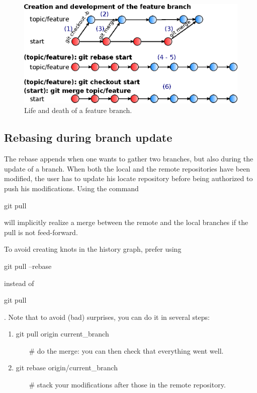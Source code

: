 \begin{figure}[htb]
\centering
\includegraphics[scale=1]{img/life_and_death.eps}
\caption{Life and death of a feature branch.}
\label{fig:life-and-death}
\end{figure}


\subsection{Rebasing during branch update}

The rebase appends when one wants to gather two branches, but also during the update of a branch.
When both the local and the remote repositories have been modified, the user has to update his
locate repository before being authorized to push his modifications.
Using the command \begin{tt}git pull\end{tt} will implicitly realize a merge between the remote and the local branches if the pull is not feed-forward.

To avoid creating knots in the history graph, prefer using \begin{tt}git pull --rebase\end{tt} instead of \begin{tt}git pull\end{tt}. 
Note that to avoid (bad) surprises, you can do it in several steps:\\
\begin{enumerate}[noitemsep]
\item \begin{tt}git pull origin current\_branch\end{tt} ~~~
 \# do the merge: you can then check that everything went well.
\item 
\begin{tt}git rebase  origin/current\_branch\end{tt}  ~~~
 \# stack your modifications after those in the remote repository.
\end{enumerate}
 
